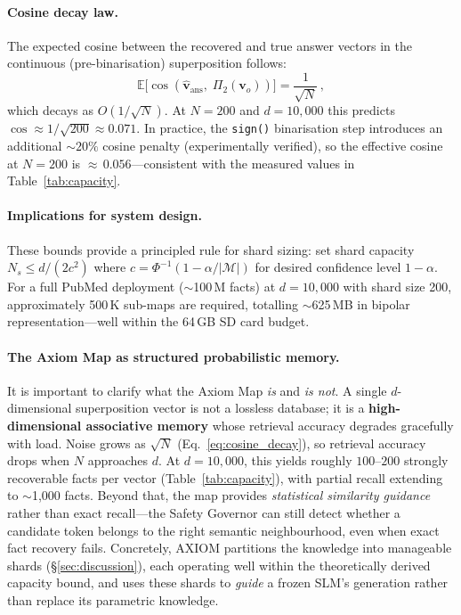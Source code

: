 \documentclass[11pt,a4paper]{article}
\begin{document}
\paragraph{Cosine decay law.}
The expected cosine between the recovered and true answer vectors
in the continuous (pre-binarisation) superposition follows:
\begin{equation}
    \mathbb{E}\bigl[\cos(\hat{\mathbf{v}}_{\text{ans}},\;
    \Pi_2(\mathbf{v}_o))\bigr]
    = \frac{1}{\sqrt{N}}\,,
    \label{eq:cosine_decay}
\end{equation}
which decays as $O(1/\sqrt{N})$.  At $N = 200$ and $d = 10{,}000$
this predicts $\cos \approx 1/\sqrt{200} \approx 0.071$.
In practice, the \texttt{sign()} binarisation step introduces an
additional ${\sim}20\%$ cosine penalty (experimentally verified),
so the effective cosine at $N\!=\!200$ is ${\approx}\,0.056$---consistent
with the measured values in Table~\ref{tab:capacity}.

\paragraph{Implications for system design.}
These bounds provide a principled rule for shard sizing:
set shard capacity $N_s \leq d / (2c^2)$ where
$c = \Phi^{-1}(1 - \alpha / |\mathcal{M}|)$ for desired confidence
level $1 - \alpha$.  For a full PubMed deployment ($\sim$100\,M facts)
at $d = 10{,}000$ with shard size 200, approximately 500\,K sub-maps
are required, totalling $\sim$625\,MB in bipolar representation---well
within the 64\,GB SD card budget.

\paragraph{The Axiom Map as structured probabilistic memory.}
It is important to clarify what the Axiom Map \emph{is} and
\emph{is not}.  A single $d$-dimensional superposition vector is not
a lossless database; it is a \textbf{high-dimensional associative
memory} whose retrieval accuracy degrades gracefully with load.
Noise grows as $\sqrt{N}$ (Eq.~\eqref{eq:cosine_decay}), so retrieval accuracy
drops when $N$ approaches $d$.  At $d=10{,}000$, this yields roughly
$100$--$200$ strongly recoverable facts per vector (Table~\ref{tab:capacity}),
with partial recall extending to $\sim$1{,}000 facts.
Beyond that, the map provides \emph{statistical similarity guidance}
rather than exact recall---the Safety Governor can still detect
whether a candidate token belongs to the right semantic neighbourhood,
even when exact fact recovery fails.  Concretely, AXIOM partitions
the knowledge into manageable shards (\S\ref{sec:discussion}), each
operating well within the theoretically derived capacity bound,
and uses these shards to \emph{guide} a frozen SLM's generation
rather than replace its parametric knowledge.
\end{document}
